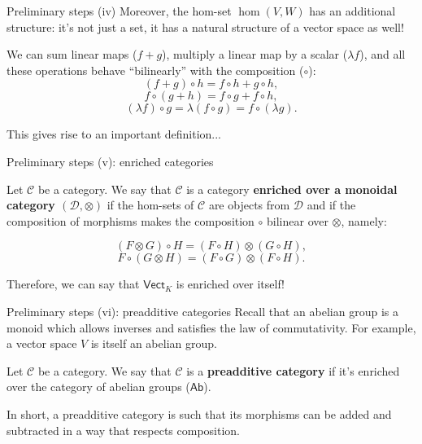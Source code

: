 \documentclass{beamer}
\newcommand{\cat}[1]{\mathsf{#1}}
\begin{document}
\begin{frame}{Preliminary steps (iv)}
    Moreover, the hom-set $\hom(V, W)$ has an additional
    structure: it's not just a set, it has a natural structure
    of a vector space as well! \medskip

    We can sum linear maps ($f + g$), multiply a linear map by
    a scalar ($\lambda f$), and all these operations behave
    ``bilinearly'' with the composition ($\circ$):
    \[
        (f + g) \circ h = f \circ h + g \circ h,
    \]
    \[
        f \circ (g + h) = f \circ g + f \circ h,
    \]
    \[
        (\lambda f) \circ g = \lambda (f \circ g) = f \circ (\lambda g).
    \]

    This gives rise to an important definition...
\end{frame}

\begin{frame}{Preliminary steps (v): enriched categories}
    \begin{definition}
        Let $\mathcal{C}$ be a category. We say that $\mathcal{C}$
        is a category \textbf{enriched over a monoidal category $(\mathcal{D}, \otimes)$}
        if the hom-sets of $\mathcal{C}$ are objects from
        $\mathcal{D}$ and if the composition of morphisms makes
        the composition $\circ$ bilinear over $\otimes$, namely:

        \[
            (F \otimes G) \circ H = (F \circ H) \otimes (G \circ H),
        \]
        \[
            F \circ (G \otimes H) = (F \circ G) \otimes (F \circ H).
        \]
    \end{definition}

    Therefore, we can say that $\cat{Vect}_K$ is enriched over itself!
\end{frame}

\begin{frame}{Preliminary steps (vi): preadditive categories}
    Recall that an abelian group is a monoid which allows inverses
    and satisfies the law of commutativity. For example, a vector
    space $V$ is itself an abelian group. \medskip

    \begin{definition}
        Let $\mathcal{C}$ be a category. We say that $\mathcal{C}$
        is a \textbf{preadditive category} if it's enriched
        over the category of abelian groups ($\cat{Ab}$).
    \end{definition} \smallskip

    In short, a preadditive category is such that its morphisms can
    be added and subtracted in a way that respects composition.
\end{frame}
\end{document}
